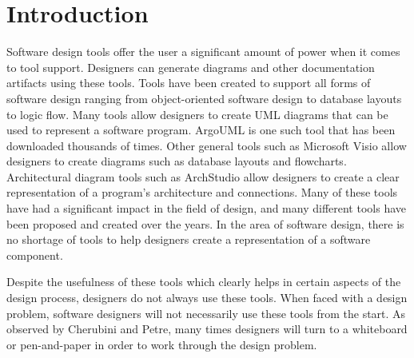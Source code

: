 \chapter{Introduction}

Software design tools offer the user a significant amount of power when it comes to tool support. 
Designers can generate diagrams and other documentation artifacts using these tools.
Tools have been created to support all forms of software design ranging from object-oriented software design to database layouts to logic flow.
Many tools allow designers to create UML diagrams that can be used to represent a software program. ArgoUML\cite{argouml} is one such tool that has been downloaded thousands of times.
Other general tools such as Microsoft Visio\cite{visio} allow designers to create diagrams such as database layouts and flowcharts. 
Architectural diagram tools such as ArchStudio\cite{archstudio} allow designers to create a clear representation of a program's architecture and connections.
Many of these tools have had a significant impact in the field of design, and many different tools have been proposed and created over the years.
In the area of software design, there is no shortage of tools to help designers create a representation of a software component.

Despite the usefulness of these tools which clearly helps in certain aspects of the design process, designers do not always use these tools.
When faced with a design problem, software designers will not necessarily use these tools from the start. 
As observed by Cherubini\cite{cherubini} and Petre\cite{petre}, many times designers will turn to a whiteboard or pen-and-paper in order to work through the design problem.

